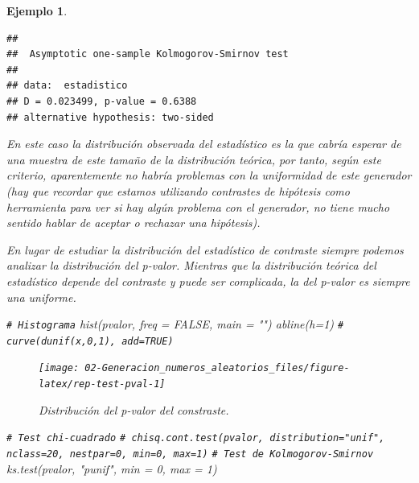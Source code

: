 \documentclass[
]{book}
\newenvironment{Shaded}{\begin{snugshade}}{\end{snugshade}}
\newcommand{\AttributeTok}[1]{\textcolor[rgb]{0.77,0.63,0.00}{#1}}
\newcommand{\CommentTok}[1]{\textcolor[rgb]{0.56,0.35,0.01}{\textit{#1}}}
\newcommand{\ConstantTok}[1]{\textcolor[rgb]{0.00,0.00,0.00}{#1}}
\newcommand{\DecValTok}[1]{\textcolor[rgb]{0.00,0.00,0.81}{#1}}
\newcommand{\FunctionTok}[1]{\textcolor[rgb]{0.00,0.00,0.00}{#1}}
\newcommand{\NormalTok}[1]{#1}
\newcommand{\StringTok}[1]{\textcolor[rgb]{0.31,0.60,0.02}{#1}}
\theoremstyle{break}
\newtheorem{example}{Ejemplo}[chapter]
\theoremstyle{nonumberplain}
\renewcommand{\CommentTok}[1]{\textcolor[rgb]{0.41,0.41,0.41}{\texttt{#1}}}
\begin{document}
\begin{example}
\begin{verbatim}
## 
##  Asymptotic one-sample Kolmogorov-Smirnov test
## 
## data:  estadistico
## D = 0.023499, p-value = 0.6388
## alternative hypothesis: two-sided
\end{verbatim}

En este caso la distribución observada del estadístico es la que cabría esperar de una muestra de este tamaño de la distribución teórica, por tanto, según este criterio, aparentemente no habría problemas con la uniformidad de este generador (hay que recordar que estamos utilizando contrastes de hipótesis como herramienta para ver si hay algún problema con el generador, no tiene mucho sentido hablar de aceptar o rechazar una hipótesis).

En lugar de estudiar la distribución del estadístico de contraste siempre podemos analizar la distribución del p-valor.
Mientras que la distribución teórica del estadístico depende del contraste y puede ser complicada, la del p-valor es siempre una uniforme.

\begin{Shaded}
\begin{Highlighting}[]
\CommentTok{\# Histograma}
\FunctionTok{hist}\NormalTok{(pvalor, }\AttributeTok{freq =} \ConstantTok{FALSE}\NormalTok{, }\AttributeTok{main =} \StringTok{""}\NormalTok{)}
\FunctionTok{abline}\NormalTok{(}\AttributeTok{h=}\DecValTok{1}\NormalTok{) }\CommentTok{\# curve(dunif(x,0,1), add=TRUE)}
\end{Highlighting}
\end{Shaded}

\begin{figure}[!htb]

{\centering \texttt{[image: 02-Generacion\_numeros\_aleatorios\_files/figure-latex/rep-test-pval-1]} 

}

\caption{Distribución del p-valor del constraste.}\label{fig:rep-test-pval}
\end{figure}

\begin{Shaded}
\begin{Highlighting}[]
\CommentTok{\# Test chi{-}cuadrado}
\CommentTok{\# chisq.cont.test(pvalor, distribution="unif", nclass=20, nestpar=0, min=0, max=1)}
\CommentTok{\# Test de Kolmogorov{-}Smirnov}
\FunctionTok{ks.test}\NormalTok{(pvalor, }\StringTok{"punif"}\NormalTok{,  }\AttributeTok{min =} \DecValTok{0}\NormalTok{, }\AttributeTok{max =} \DecValTok{1}\NormalTok{)}
\end{Highlighting}
\end{Shaded}


\end{example}
\end{document}
